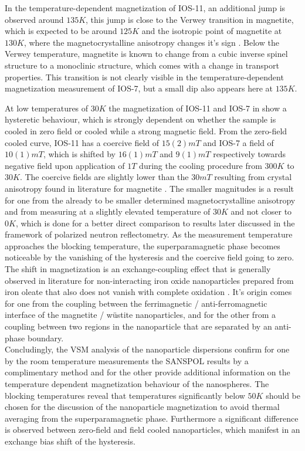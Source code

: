 \documentclass[\main/dresen_thesis.tex]{subfiles}
\begin{document}
  In the temperature-dependent magnetization of IOS-11, an additional jump is observed around $135 \unit{K}$, this jump is close to the Verwey transition in magnetite, which is expected to be around $125 \unit{K}$ \cite{Walz_2002_Theve} and the isotropic point of magnetite at $130 \unit{K}$, where the magnetocrystalline anisotropy changes it's sign \cite{Muxworthy_1999_Lowte}.
  Below the Verwey temperature, magnetite is known to change from a cubic inverse spinel structure to a monoclinic structure, which comes with a change in transport properties.
  This transition is not clearly visible in the temperature-dependent magnetization measurement of IOS-7, but a small dip also appears here at $135 \unit{K}$.

  At low temperatures of $30 \unit{K}$ the magnetization of IOS-11 and IOS-7 in  show a hysteretic behaviour, which is strongly dependent on whether the sample is cooled in zero field or cooled while a strong magnetic field.
  From the zero-field cooled curve, IOS-11 has a coercive field of $15(2) \unit{mT}$ and IOS-7 a field of $10(1) \unit{mT}$, which is shifted by $16(1) \unit{mT}$ and $9(1) \unit{mT}$ respectively towards negative field upon application of $1 \unit{T}$ during the cooling procedure from $300 \unit{K}$ to $30 \unit{K}$.
  The coercive fields are slightly lower than the $30 \unit{mT}$ resulting from crystal anisotropy found in literature for magnetite \cite{Cornell_2003_Their}.
  The smaller magnitudes is a result for one from the already to be smaller determined magnetocrystalline anisotropy and from measuring at a slightly elevated temperature of $30 \unit{K}$ and not closer to $0 \unit{K}$, which is done for a better direct comparison to results later discussed in the framework of polarized neutron reflectometry.
  As the measurement temperature approaches the blocking temperature, the superparamagnetic phase becomes noticeable by the vanishing of the hysteresis and the coercive field going to zero.
  The shift in magnetization is an exchange-coupling effect that is generally observed in literature for non-interacting iron oxide nanoparticles prepared from iron oleate that also does not vanish with complete oxidation \cite{Wetterskog_2013_Anoma}.
  It's origin comes for one from the coupling between the ferrimagnetic / anti-ferromagnetic interface of the magnetite / w\"ustite nanoparticles, and for the other from a coupling between two regions in the nanoparticle that are separated by an anti-phase boundary.
  \\

  Concludingly, the VSM analysis of the nanoparticle dispersions confirm for one by the room temperature measurements the SANSPOL results by a complimentary method and for the other provide additional information on the temperature dependent magnetization behaviour of the nanospheres.
  The blocking temperatures reveal that temperatures significantly below $50 \unit{K}$ should be chosen for the discussion of the nanoparticle magnetization to avoid thermal averaging from the superparamagnetic phase.
  Furthermore a significant difference is observed between zero-field and field cooled nanoparticles, which manifest in an exchange bias shift of the hysteresis.
\end{document}
